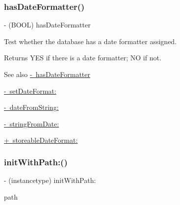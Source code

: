 \subsubsection{\texorpdfstring{has\+Date\+Formatter()}{hasDateFormatter()}}
{\footnotesize\ttfamily -\/ (B\+O\+OL) has\+Date\+Formatter \begin{DoxyParamCaption}{ }\end{DoxyParamCaption}}

Test whether the database has a date formatter assigned.

\begin{DoxyReturn}{Returns}
{\ttfamily Y\+ES} if there is a date formatter; {\ttfamily NO} if not.
\end{DoxyReturn}
\begin{DoxySeeAlso}{See also}
\mbox{\hyperlink{interface_o_p_t_l_y_f_m_d_b_database_a820a1ababb4c5496800b9bcd5f2de784}{-\/ has\+Date\+Formatter}} 

\mbox{\hyperlink{interface_o_p_t_l_y_f_m_d_b_database_a48c1936bc68ddd11cea9aa177b0cc94e}{-\/ set\+Date\+Format\+:}} 

\mbox{\hyperlink{interface_o_p_t_l_y_f_m_d_b_database_a5368268fe8e6d881d0da4d3538607768}{-\/ date\+From\+String\+:}} 

\mbox{\hyperlink{interface_o_p_t_l_y_f_m_d_b_database_a60793c2b214e29c00143fdf9510837d7}{-\/ string\+From\+Date\+:}} 

\mbox{\hyperlink{interface_o_p_t_l_y_f_m_d_b_database_acb3eef48cd21dcb11407b88dac662c57}{+ storeable\+Date\+Format\+:}} 
\end{DoxySeeAlso}
\mbox{\label{interface_o_p_t_l_y_f_m_d_b_database_a146d2b8c55019b67f45217aeb008e78e}} 
\subsubsection{\texorpdfstring{init\+With\+Path\+:()}{initWithPath:()}}
{\footnotesize\ttfamily -\/ (instancetype) init\+With\+Path\+: \begin{DoxyParamCaption}\item[{(N\+S\+String $\ast$\+\_\+\+Nullable)}]{path }\end{DoxyParamCaption}}

